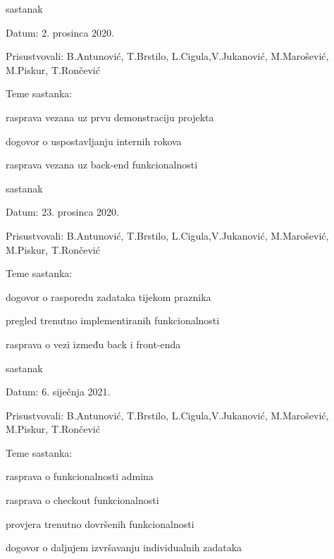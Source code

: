 \begin{packed_enum}
			\item  sastanak
			\item[] \begin{packed_item}
				\item Datum: 2. prosinca 2020.
				\item Prisustvovali: B.Antunović, T.Brstilo, L.Cigula,V.Jukanović, M.Marošević, M.Piskur, T.Rončević
				\item Teme sastanka:
				\begin{packed_item}
					\item  rasprava vezana uz prvu demonstraciju projekta
					\item  dogovor o uspostavljanju internih rokova
					\item  rasprava vezana uz back-end funkcionalnosti
				\end{packed_item}
			\end{packed_item}
		
			\item  sastanak
			\item[] \begin{packed_item}
				\item Datum: 23. prosinca 2020.
				\item Prisustvovali: B.Antunović, T.Brstilo, L.Cigula,V.Jukanović, M.Marošević, M.Piskur, T.Rončević
				\item Teme sastanka:
				\begin{packed_item}
					\item  dogovor o rasporedu zadataka tijekom praznika
					\item  pregled trenutno implementiranih funkcionalnosti
					\item  rasprava o vezi između back i front-enda	
			\end{packed_item}
		\end{packed_item}
		
			\item  sastanak
			\item[] \begin{packed_item}
				\item Datum: 6. siječnja 2021.
				\item Prisustvovali: B.Antunović, T.Brstilo, L.Cigula,V.Jukanović, M.Marošević, M.Piskur, T.Rončević
				\item Teme sastanka:
				\begin{packed_item}
					\item  rasprava o funkcionalnosti admina
					\item  rasprava o checkout funkcionalnosti
					\item  provjera trenutno dovršenih funkcionalnosti
					\item  dogovor o daljnjem izvršavanju individualnih zadataka
				\end{packed_item}
			\end{packed_item}
			

\end{packed_enum}

